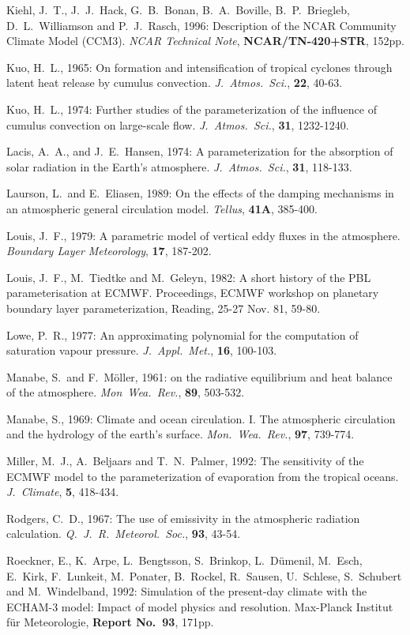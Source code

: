 Kiehl, J.~T., J.~J.~Hack, G.~B.~Bonan, B.~A.~Boville, B.~P.~Briegleb, D.~L.~Williamson
and
P.~J.~Rasch, 1996: Description of the NCAR Community Climate Model (CCM3). {\it NCAR
Technical Note}, {\bf NCAR/TN-420+STR}, 152pp.

Kuo, H.~L., 1965: On formation and intensification of
tropical cyclones through latent heat
release by cumulus convection. {\it J.~Atmos.~Sci.},
{\bf 22}, 40-63.

Kuo, H.~L., 1974: Further studies of the
parameterization of the influence of cumulus
convection on large-scale flow. {\it J.~Atmos.~Sci.},
{\bf 31}, 1232-1240.

Lacis, A.~A., and J.~E.~Hansen, 1974: A parameterization for the absorption of solar
radiation in the Earth's atmosphere. {\it J.~Atmos.~Sci.}, {\bf 31}, 118-133. 

Laurson, L.~and E.~Eliasen, 1989: On the effects of
the damping mechanisms in an
atmospheric general circulation model. {\it Tellus},
{\bf 41A}, 385-400.

Louis, J.~F., 1979: A parametric model of vertical
eddy fluxes in the atmosphere.
{\it Boundary Layer Meteorology}, {\bf 17}, 187-202.

Louis, J.~F., M.~Tiedtke and M.~Geleyn, 1982: A
short history of the PBL parameterisation
at ECMWF. Proceedings, ECMWF workshop on
planetary boundary layer parameterization,
Reading, 25-27 Nov. 81, 59-80. 

Lowe, P.~R., 1977: An approximating polynomial for
the computation of saturation vapour
pressure. {\it J.~Appl.~Met.}, {\bf 16}, 100-103.

Manabe, S.~and F.~M\"oller, 1961: on the radiative
equilibrium and heat balance of the
atmosphere. {\it Mon~Wea.~Rev.}, {\bf 89}, 503-532. 

Manabe, S., 1969: Climate and ocean circulation. I.
The atmospheric circulation and the
hydrology of the earth's surface. {\it
Mon.~Wea.~Rev.}, {\bf 97}, 739-774. 

Miller, M.~J., A.~Beljaars and T.~N.~Palmer, 1992: The sensitivity of the ECMWF model to the parameterization of evaporation from the tropical oceans. {\it
J.~Climate}, {\bf 5}, 418-434. 


Rodgers, C.~D., 1967: The use of emissivity in the
atmospheric radiation calculation.
{\it Q.~J.~R.~Meteorol.~Soc.}, {\bf 93}, 43-54. 

Roeckner, E., K.~Arpe, L.~Bengtsson, S.~Brinkop,
L.~D\"umenil, M.~Esch, E.~Kirk,
F.~Lunkeit, M.~Ponater, B.~Rockel, R.~Sausen,
U.~Schlese, S.~Schubert and
M.~Windelband,
1992: Simulation of the present-day climate with the
ECHAM-3 model: Impact of model
physics
and resolution. Max-Planck Institut f\"ur Meteorologie,
{\bf Report No.~93}, 171pp.

